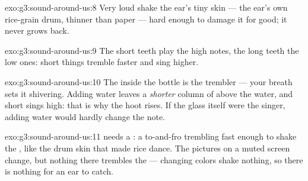 \begin{solution}{exo:g3:sound-around-us:8}
Very loud  shake the ear's tiny skin --- the ear's own
rice-grain drum, thinner than paper --- hard enough to damage it for
good; it never grows back.
\end{solution}

\begin{solution}{exo:g3:sound-around-us:9}
The short teeth play the high notes, the long teeth the low ones:
short things tremble faster and sing higher.
\end{solution}

\begin{solution}{exo:g3:sound-around-us:10}
The  inside the bottle is the trembler --- your breath sets it
shivering. Adding water leaves a \emph{shorter} column of  above
the water, and short sings high: that is why the hoot rises. If the
glass itself were the singer, adding water would hardly change the
note.
\end{solution}

\begin{solution}{exo:g3:sound-around-us:11}
 needs a \emph{}: a to-and-fro trembling fast enough
to shake the , like the drum skin that made rice dance. The
pictures on a muted screen change, but nothing there trembles the
 --- changing colors shake nothing, so there is nothing for an
ear to catch.
\end{solution}
